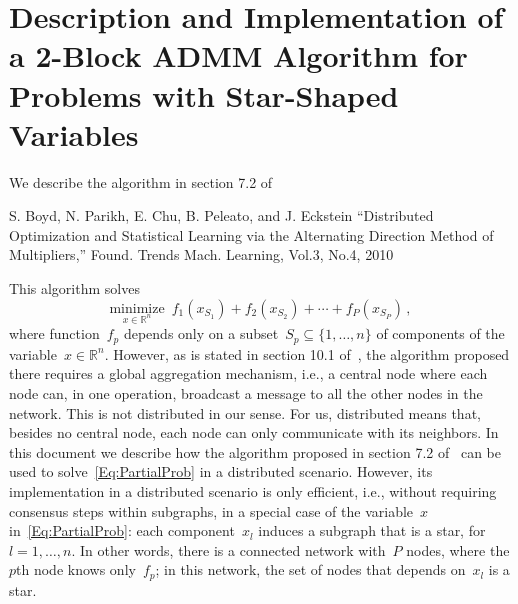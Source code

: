 \documentclass[letter,10pt]{article}
\theoremstyle{definition}
\theoremstyle{nonumberplain}
\begin{document}
\section*{Description and Implementation of a 2-Block ADMM Algorithm for Problems with Star-Shaped Variables}

	We describe the algorithm in section 7.2 of

	\bigskip
	\noindent
	\cite{Boyd10-ADMM}
	\quad
	S. Boyd, N. Parikh, E. Chu, B. Peleato, and J. Eckstein ``Distributed Optimization and Statistical Learning via the Alternating Direction Method of Multipliers,'' Found. Trends Mach. Learning, Vol.3, No.4, 2010

	\bigskip
	\noindent
	This algorithm solves
	\begin{equation}\label{Eq:PartialProb}
		\underset{x \in \mathbb{R}^n}{\text{minimize}} \,\,\, f_1(x_{S_1}) + f_2(x_{S_2}) + \cdots + f_P(x_{S_P})\,,
	\end{equation}
	where function~$f_p$ depends only on a subset~$S_p \subseteq \{1,\ldots,n\}$ of components of the variable~$x \in \mathbb{R}^n$. However, as is stated in section 10.1 of~\cite{Boyd10-ADMM}, the algorithm proposed there requires a global aggregation mechanism, i.e., a central node where each node can, in one operation, broadcast a message to all the other nodes in the network. This is not distributed in our sense. For us, distributed means that, besides no central node, each node can only communicate with its neighbors. In this document we describe how the algorithm proposed in section 7.2 of~\cite{Boyd10-ADMM} can be used to solve~\eqref{Eq:PartialProb} in a distributed scenario. However, its implementation in a distributed scenario is only efficient, i.e., without requiring consensus steps within subgraphs, in a special case of the variable~$x$ in~\eqref{Eq:PartialProb}: each component~$x_l$ induces a subgraph that is a star, for~$l=1,\ldots,n$. In other words, there is a connected network with~$P$ nodes, where the $p$th node knows only~$f_p$; in this network, the set of nodes that depends on~$x_l$ is a star.
\end{document}
